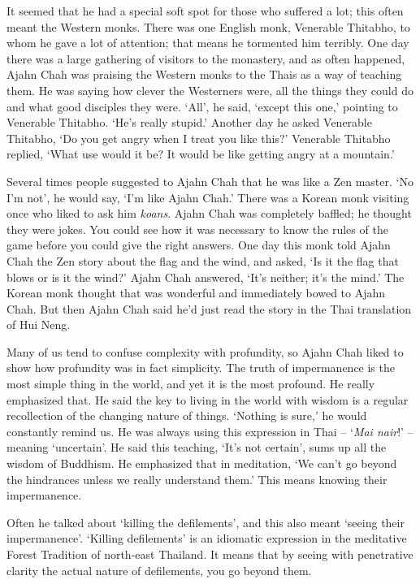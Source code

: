 It seemed that he had a special soft spot for those who suffered a lot;
this often meant the Western monks. There was one English monk,
Venerable Thitabho, to whom he gave a lot of attention; that means he
tormented him terribly. One day there was a large gathering of visitors
to the monastery, and as often happened, Ajahn Chah was praising the
Western monks to the Thais as a way of teaching them. He was saying how
clever the Westerners were, all the things they could do and what good
disciples they were. `All', he said, `except this one,' pointing to
Venerable Thitabho. `He's really stupid.' Another day he asked Venerable
Thitabho, `Do you get angry when I treat you like this?' Venerable
Thitabho replied, `What use would it be? It would be like getting angry
at a mountain.'

Several times people suggested to Ajahn Chah that he was like a Zen
master. `No I'm not', he would say, `I'm like Ajahn Chah.' There was a
Korean monk visiting once who liked to ask him \emph{koans}. Ajahn Chah
was completely baffled; he thought they were jokes. You could see how it
was necessary to know the rules of the game before you could give the
right answers. One day this monk told Ajahn Chah the Zen story about the
flag and the wind, and asked, `Is it the flag that blows or is it the
wind?' Ajahn Chah answered, `It's neither; it's the mind.' The Korean
monk thought that was wonderful and immediately bowed to Ajahn Chah. But
then Ajahn Chah said he'd just read the story in the Thai translation of
Hui Neng.

Many of us tend to confuse complexity with profundity, so Ajahn Chah
liked to show how profundity was in fact simplicity. The truth of
impermanence is the most simple thing in the world, and yet it is the
most profound. He really emphasized that. He said the key to living in
the world with wisdom is a regular recollection of the changing nature
of things. `Nothing is sure,' he would constantly remind us. He was
always using this expression in Thai -- `\emph{Mai nair}!' -- meaning
`uncertain'. He said this teaching, `It's not certain', sums up all the
wisdom of Buddhism. He emphasized that in meditation, `We can't go
beyond the hindrances unless we really understand them.' This means
knowing their impermanence.

Often he talked about `killing the defilements', and this also meant
`seeing their impermanence'. `Killing defilements' is an idiomatic
expression in the meditative Forest Tradition of north-east Thailand. It
means that by seeing with penetrative clarity the actual nature of
defilements, you go beyond them.

